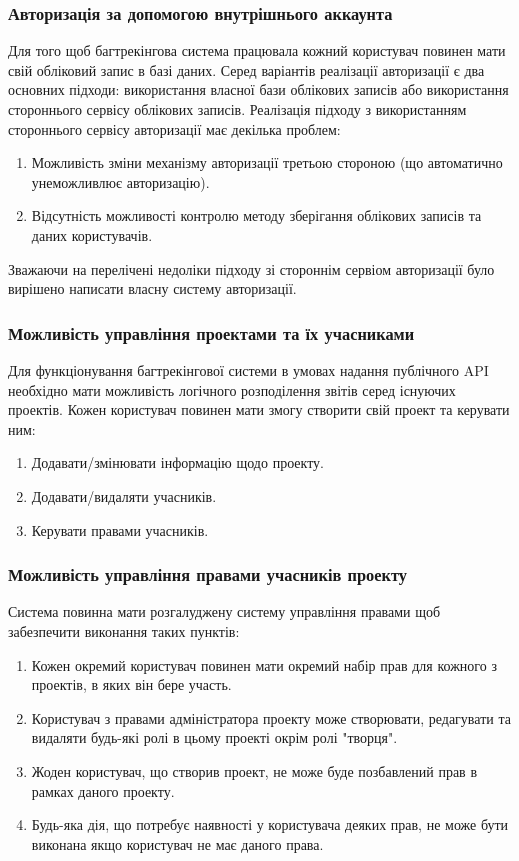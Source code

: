 \documentclass[../main.tex]{subfiles}
\begin{document}
\subsubsection{Авторизація за допомогою внутрішнього аккаунта}
Для того щоб багтрекінгова система працювала кожний користувач повинен мати свій обліковий запис в базі даних. Серед варіантів реалізації авторизації є два основних підходи: використання власної бази облікових записів або використання стороннього сервісу облікових записів. Реалізація підходу з використанням стороннього сервісу авторизації має декілька проблем:
\begin{enumerate}
    \item Можливість зміни механізму авторизації третьою стороною (що автоматично унеможливлює авторизацію).
    \item Відсутність можливості контролю методу зберігання облікових записів та даних користувачів.
\end{enumerate}

Зважаючи на перелічені недоліки підходу зі стороннім сервіом авторизації було вирішено написати власну систему авторизації.

\subsubsection{Можливість управління проектами та їх учасниками}
Для функціонування багтрекінгової системи в умовах надання публічного API необхідно мати можливість логічного розподілення звітів серед існуючих проектів. Кожен користувач повинен мати змогу створити свій проект та керувати ним:
\begin{enumerate}
    \item Додавати/змінювати інформацію щодо проекту.
    \item Додавати/видаляти учасників.
    \item Керувати правами учасників.
\end{enumerate}

\subsubsection{Можливість управління правами учасників проекту}
Система повинна мати розгалуджену систему управління правами щоб забезпечити виконання таких пунктів:
\begin{enumerate}
    \item Кожен окремий користувач повинен мати окремий набір прав для кожного з проектів, в яких він бере участь.
    \item Користувач з правами адміністратора проекту може створювати, редагувати та видаляти будь-які ролі в цьому проекті окрім ролі "творця".
    \item Жоден користувач, що створив проект, не може буде позбавлений прав в рамках даного проекту.
    \item Будь-яка дія, що потребує наявності у користувача деяких прав, не може бути виконана якщо користувач не має даного права.
\end{enumerate}
\end{document}
